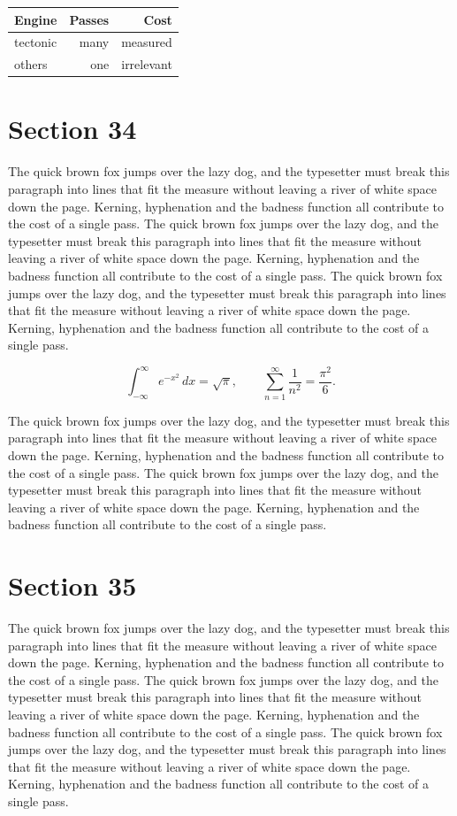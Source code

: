 \documentclass{article}
\begin{document}
\begin{center}
\begin{tabular}{lrr}
\toprule
Engine & Passes & Cost \\
\midrule
tectonic & many & measured \\
others & one & irrelevant \\
\bottomrule
\end{tabular}
\end{center}

\section{Section 34}
The quick brown fox jumps over the lazy dog, and the typesetter must break this paragraph into lines that fit the measure without leaving a river of white space down the page. Kerning, hyphenation and the badness function all contribute to the cost of a single pass. The quick brown fox jumps over the lazy dog, and the typesetter must break this paragraph into lines that fit the measure without leaving a river of white space down the page. Kerning, hyphenation and the badness function all contribute to the cost of a single pass. The quick brown fox jumps over the lazy dog, and the typesetter must break this paragraph into lines that fit the measure without leaving a river of white space down the page. Kerning, hyphenation and the badness function all contribute to the cost of a single pass. 

\begin{equation}
\int_{-\infty}^{\infty} e^{-x^{2}}\,dx = \sqrt{\pi}, \qquad
\sum_{n=1}^{\infty} \frac{1}{n^{2}} = \frac{\pi^{2}}{6}.
\end{equation}

The quick brown fox jumps over the lazy dog, and the typesetter must break this paragraph into lines that fit the measure without leaving a river of white space down the page. Kerning, hyphenation and the badness function all contribute to the cost of a single pass. The quick brown fox jumps over the lazy dog, and the typesetter must break this paragraph into lines that fit the measure without leaving a river of white space down the page. Kerning, hyphenation and the badness function all contribute to the cost of a single pass. 
\section{Section 35}
The quick brown fox jumps over the lazy dog, and the typesetter must break this paragraph into lines that fit the measure without leaving a river of white space down the page. Kerning, hyphenation and the badness function all contribute to the cost of a single pass. The quick brown fox jumps over the lazy dog, and the typesetter must break this paragraph into lines that fit the measure without leaving a river of white space down the page. Kerning, hyphenation and the badness function all contribute to the cost of a single pass. The quick brown fox jumps over the lazy dog, and the typesetter must break this paragraph into lines that fit the measure without leaving a river of white space down the page. Kerning, hyphenation and the badness function all contribute to the cost of a single pass. 
\end{document}

